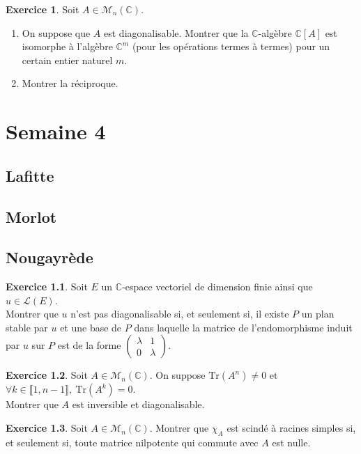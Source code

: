 \documentclass[french]{book}
\newcommand{\C}{\mathbb{C}}
\newcommand{\Tr}{\text{Tr}}
\theoremstyle{definition}
\newtheorem{ex}{Exercice}[chapter]
\begin{document}
\begin{ex}
	Soit $A\in\mathcal{M}_n(\C)$.
	\begin{enumerate}
		\item On suppose que $A$ est diagonalisable. Montrer que la $\C$-algèbre $\C[A]$ est isomorphe à l'algèbre $\C^m$ (pour les opérations termes à termes) pour un certain entier naturel $m$.
		\item Montrer la réciproque.
	\end{enumerate}
\end{ex}

\chapter{Semaine 4}

\section{Lafitte}

\section{Morlot}

\section{Nougayrède}

\begin{ex}
	Soit $E$ un $\C$-espace vectoriel de dimension finie ainsi que $u\in\mathcal{L}(E)$. \\ Montrer que $u$ n'est pas diagonalisable si, et seulement si, il existe $P$ un plan stable par $u$ et une base de $P$ dans laquelle la matrice de l'endomorphisme induit par $u$ sur $P$ est de la forme $\displaystyle\begin{pmatrix}
		\lambda&1\\
		0&\lambda
	\end{pmatrix}$.
\end{ex}

\begin{ex}
	Soit $A\in\mathcal{M}_n(\C)$. On suppose $\Tr(A^n)\ne0$ et $\forall k\in\llbracket1,n-1\rrbracket,\ \Tr(A^k)=0$. \\ Montrer que $A$ est inversible et diagonalisable.
\end{ex}

\begin{ex}
	Soit $A\in\mathcal{M}_n(\C)$. Montrer que $\chi_A$ est scindé à racines simples si, et seulement si, toute matrice nilpotente qui commute avec $A$ est nulle.
\end{ex}
\end{document}
